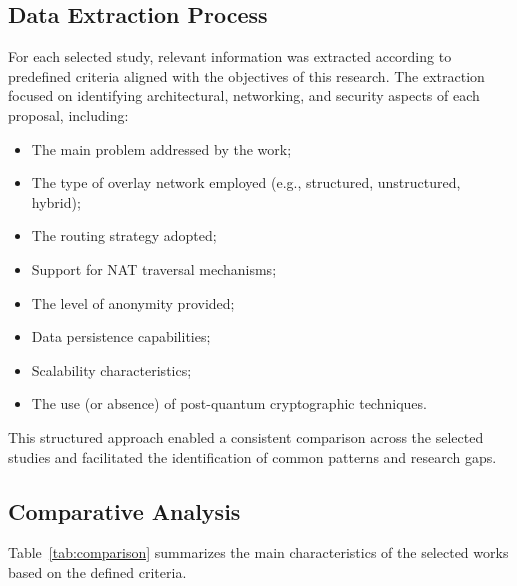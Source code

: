 \documentclass[12pt]{article}
\begin{document}
\subsection{Data Extraction Process}

For each selected study, relevant information was extracted according to predefined criteria aligned with the objectives of this research. The extraction focused on identifying architectural, networking, and security aspects of each proposal, including:

\begin{itemize}
    \item The main problem addressed by the work;
    \item The type of overlay network employed (e.g., structured, unstructured, hybrid);
    \item The routing strategy adopted;
    \item Support for NAT traversal mechanisms;
    \item The level of anonymity provided;
    \item Data persistence capabilities;
    \item Scalability characteristics;
    \item The use (or absence) of post-quantum cryptographic techniques.
\end{itemize}

This structured approach enabled a consistent comparison across the selected studies and facilitated the identification of common patterns and research gaps.

\subsection{Comparative Analysis}

Table~\ref{tab:comparison} summarizes the main characteristics of the selected works based on the defined criteria.
\end{document}
